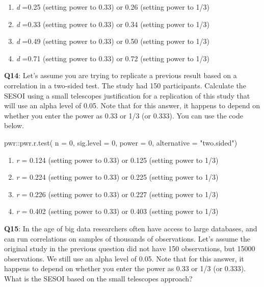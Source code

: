 \documentclass[
  oneside]{book}
\newenvironment{Shaded}{\begin{snugshade}}{\end{snugshade}}
\newcommand{\AttributeTok}[1]{\textcolor[rgb]{0.77,0.63,0.00}{#1}}
\newcommand{\DecValTok}[1]{\textcolor[rgb]{0.00,0.00,0.81}{#1}}
\newcommand{\FunctionTok}[1]{\textcolor[rgb]{0.00,0.00,0.00}{#1}}
\newcommand{\NormalTok}[1]{#1}
\newcommand{\SpecialCharTok}[1]{\textcolor[rgb]{0.00,0.00,0.00}{#1}}
\newcommand{\StringTok}[1]{\textcolor[rgb]{0.31,0.60,0.02}{#1}}
\providecommand{\tightlist}{%
  \setlength{\itemsep}{0pt}\setlength{\parskip}{0pt}}
\begin{document}
\begin{enumerate}
\def\labelenumi{\Alph{enumi})}
\tightlist
\item
  \emph{d} =0.25 (setting power to 0.33) or 0.26 (setting power to 1/3)
\item
  \emph{d} =0.33 (setting power to 0.33) or 0.34 (setting power to 1/3)
\item
  \emph{d} =0.49 (setting power to 0.33) or 0.50 (setting power to 1/3)
\item
  \emph{d} =0.71 (setting power to 0.33) or 0.72 (setting power to 1/3)
\end{enumerate}

\textbf{Q14}: Let's assume you are trying to replicate a previous result based on a correlation in a two-sided test. The study had 150 participants. Calculate the SESOI using a small telescopes justification for a replication of this study that will use an alpha level of 0.05. Note that for this answer, it happens to depend on whether you enter the power as 0.33 or 1/3 (or 0.333). You can use the code below.

\begin{Shaded}
\begin{Highlighting}[]
\NormalTok{pwr}\SpecialCharTok{::}\FunctionTok{pwr.r.test}\NormalTok{(}
  \AttributeTok{n =} \DecValTok{0}\NormalTok{, }
  \AttributeTok{sig.level =} \DecValTok{0}\NormalTok{, }
  \AttributeTok{power =} \DecValTok{0}\NormalTok{, }
  \AttributeTok{alternative =} \StringTok{"two.sided"}\NormalTok{)}
\end{Highlighting}
\end{Shaded}

\begin{enumerate}
\def\labelenumi{\Alph{enumi})}
\tightlist
\item
  \emph{r} = 0.124 (setting power to 0.33) or 0.125 (setting power to 1/3)
\item
  \emph{r} = 0.224 (setting power to 0.33) or 0.225 (setting power to 1/3)
\item
  \emph{r} = 0.226 (setting power to 0.33) or 0.227 (setting power to 1/3)
\item
  \emph{r} = 0.402 (setting power to 0.33) or 0.403 (setting power to 1/3)
\end{enumerate}

\textbf{Q15}: In the age of big data researchers often have access to large databases, and can run correlations on samples of thousands of observations. Let's assume the original study in the previous question did not have 150 observations, but 15000 observations. We still use an alpha level of 0.05. Note that for this answer, it happens to depend on whether you enter the power as 0.33 or 1/3 (or 0.333). What is the SESOI based on the small telescopes approach?
\end{document}
